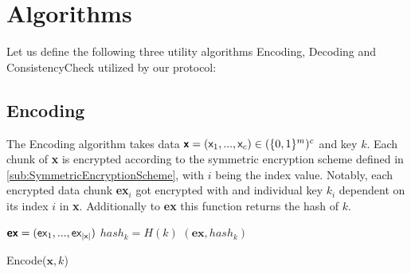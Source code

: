 \documentclass{cacthesis}
\newcounter{protocol}
\begin{document}
        \section{Algorithms}
        Let us define the following three utility algorithms \textsf{Encoding}, \textsf{Decoding} and \textsf{ConsistencyCheck} utilized by our protocol:
        \subsection{Encoding}
        The \textsf{Encoding} algorithm takes data $\textsf{\textbf{x}} = (\textsf{x}_1, ..., \textsf{x}_c) \in (\{0,1\}^m)^c$ and key $k$. Each chunk of \textsf{\textbf{x}} is encrypted according to the symmetric encryption scheme defined in \ref{sub:SymmetricEncryptionScheme}, with $i$ being the index value. Notably, each encrypted data chunk \textsf{\textbf{ex}}$_i$ got encrypted with and individual key $k_i$ dependent on its index $i$ in \textsf{\textbf{x}}. Additionally to \textsf{\textbf{ex}} this function returns the hash of $k$.
        \begin{center}
        \begin{minipage}[t]{4in}
            \begin{algorithm}[H]
                $\textsf{\textbf{ex}} = (\textsf{ex}_1,..., \textsf{ex}_{|\textsf{x}|})$\;
                $hash_k = H(k)$\;
                \Return $(\textbf{ex}, hash_k)$\;
                \caption{\textsf{Encode($\textbf{x}, k$)}}
            \end{algorithm}
        \end{minipage}    
        \end{center}
        
\end{document}
